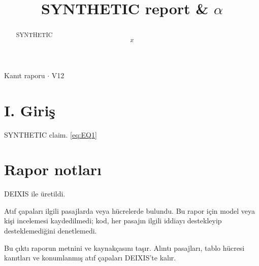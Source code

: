 \documentclass[journal]{IEEEtran}
\begin{document}
\renewcommand{\abstractname}{Özet}
\renewcommand{\IEEEkeywordsname}{Dizin Terimleri}
\renewcommand{\refname}{Kaynaklar}

\title{SYNTHETIC report \& \ensuremath{\alpha}}

\maketitle

\noindent Kanıt raporu \ensuremath{\cdot} V12

\begin{abstract}

SYNTHETIC
\begin{equation}
\label{eq:EQ1}
x
\end{equation}
\cite{Synth26}

\end{abstract}

\section*{I. Giriş}

SYNTHETIC claim. \eqref{eq:EQ1} \cite{Synth26}

\section*{Rapor notları}

DEIXIS ile üretildi.

Atıf çapaları ilgili pasajlarda veya hücrelerde bulundu. Bu rapor için model veya kişi incelemesi kaydedilmedi; kod, her pasajın ilgili iddiayı destekleyip desteklemediğini denetlemedi.

Bu çıktı raporun metnini ve kaynakçasını taşır. Alıntı pasajları, tablo hücresi kanıtları ve konumlanmış atıf çapaları DEIXIS'te kalır.




\end{document}
